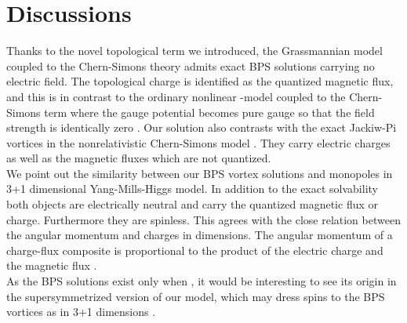 \documentclass[a4paper,12pt]{article}
\begin{document}
\section{Discussions}
Thanks to the novel topological term we introduced,
the Grassmannian model coupled to the Chern-Simons theory
admits exact BPS solutions carrying no electric field. The
topological charge is identified as the quantized magnetic flux, and
this is in contrast to the ordinary
 \coordHE{} nonlinear \myHighlight{$\sigma$}\coordHE{}-model coupled to the Chern-Simons term \cite{nard} where
the gauge potential becomes pure gauge so that the field strength is identically zero \cite{twoform}. Our solution
also contrasts with the exact Jackiw-Pi vortices in the nonrelativistic Chern-Simons model \cite{jackiw}.  They
carry electric charges as well as  the magnetic fluxes which are not quantized. \\





We point out  the  similarity between our BPS vortex solutions and monopoles  in 3+1 dimensional Yang-Mills-Higgs
model. In addition to the exact solvability both objects are electrically neutral and carry the quantized magnetic
flux or charge. Furthermore they are spinless.     This agrees with the close relation between the angular
momentum and charges in \coordHE{} dimensions. The angular momentum  of a charge-flux composite is proportional to the
product of the electric charge and the magnetic flux \cite{wilczek}.\\






As the BPS solutions exist only when \coordHE{}, it would be interesting to see its origin in the
supersymmetrized version of our model, which may dress spins to the BPS vortices as in 3+1 dimensions \cite{ho}.
\\
\end{document}
